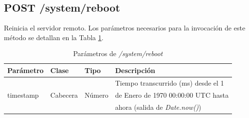 %
%
\subsection{POST /system/reboot}

Reinicia el servidor remoto. Los parámetros necesarios para la invocación de este método se detallan en la Tabla \ref{extra:api:reboot:invocacion}.

\begin{table}[H]
\centering
\begin{tabular}{|l|l|l|l|}
\hline
\rowcolor[HTML]{F5F5F5}
\textbf{Parámetro}  & \textbf{Clase} & \textbf{Tipo} & \textbf{Descripción}                  \\ \hline
                    &                &               & Tiempo transcurrido (ms) desde el 1   \\
timestamp           & Cabecera       & Número        & de Enero de 1970 00:00:00 UTC hasta   \\
                    &                &               & ahora (salida de \textit{Date.now()}) \\ \hline
\end{tabular}
\caption{Parámetros de \textit{/system/reboot}}
\label{extra:api:reboot:invocacion}
\end{table}

